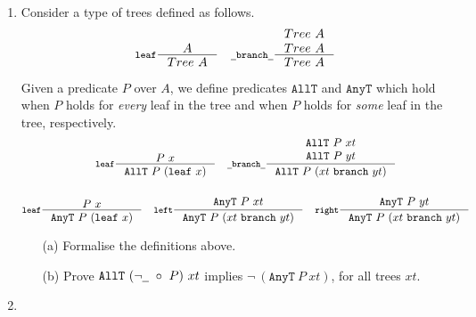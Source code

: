 \documentclass{examhons2018}
\begin{document}
\begin{enumerate}
 
\item \rubricqA

\newcommand{\Tree}{\texttt{Tree}}
\newcommand{\AllT}{\texttt{AllT}}
\newcommand{\AnyT}{\texttt{AnyT}}
\newcommand{\leaf}{\texttt{leaf}}
\newcommand{\branch}{\texttt{branch}}  
\newcommand{\here}{\texttt{here}}
\renewcommand{\left}{\texttt{left}}
\renewcommand{\right}{\texttt{right}}
\newcommand{\ubar}{\texttt{\underline{~}}}

Consider a type of trees defined as follows.
\begin{gather*}
%
  \inference[\leaf]
    {A}
    {Tree~A}
%
\quad
%    
  \inference[\ubar\branch\ubar]
    {Tree~A \\
     Tree~A}
   {Tree~A}
%
\end{gather*}

Given a predicate $P$ over $A$, we define predicates $\AllT$ and
$\AnyT$ which hold when $P$ holds for \emph{every} leaf in the tree
and when $P$ holds for \emph{some} leaf in the tree, respectively.
\begin{gather*}
%
  \inference[\leaf]
    {P~x}
    {\AllT~P~(\leaf~x)}
%
\quad
%    
  \inference[\ubar\branch\ubar]
    {\AllT~P~xt \\   
     \AllT~P~yt}
    {\AllT~P~(xt~\branch~yt)}
%  
\\~\\  
%
  \inference[\leaf]
    {P~x}
    {\AnyT~P~(\leaf~x)}
%
\quad
%    
  \inference[\left]
    {\AnyT~P~xt}  
    {\AnyT~P~(xt~\branch~yt)}
%
\quad
%    
  \inference[\right]
    {\AnyT~P~yt}  
    {\AnyT~P~(xt~\branch~yt)}
%
\end{gather*}    

\begin{itemize}

\item[(a)] Formalise the definitions above.


\item[(b)] Prove $\AllT~({\neg\ubar}~\circ~P)~xt$
  implies $\neg~(\AnyT~P~xt)$, for all trees $xt$.


\end{itemize}

\newpage

\item \rubricqB

\newcommand{\COMP}{\texttt{Comp}}
\newcommand{\OK}{\texttt{ok}}
\newcommand{\ERROR}{\texttt{error}}
\newcommand{\LETC}{\texttt{letc}}
\newcommand{\IN}{\texttt{in}}  


\end{enumerate}
\end{document}

